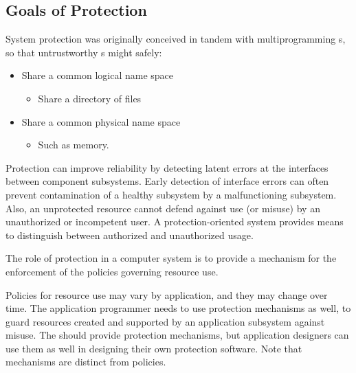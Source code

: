 \subsection{Goals of Protection}\label{subsec:Goals_of_Protection}
System protection was originally conceived in tandem with multiprogramming s, so that untrustworthy s might safely:
\begin{itemize}[noitemsep]
\item Share a common logical name space
  \begin{itemize}[noitemsep]
  \item Share a directory of files
  \end{itemize}
\item Share a common physical name space
  \begin{itemize}[noitemsep]
  \item Such as memory.
  \end{itemize}
\end{itemize}

Protection can improve reliability by detecting latent errors at the interfaces between component subsystems.
Early detection of interface errors can often prevent contamination of a healthy subsystem by a malfunctioning subsystem.
Also, an unprotected resource cannot defend against use (or misuse) by an unauthorized or incompetent user.
A protection-oriented system provides means to distinguish between authorized and unauthorized usage.

The role of protection in a computer system is to provide a mechanism for the enforcement of the policies governing resource use.

Policies for resource use may vary by application, and they may change over time.
The application programmer needs to use protection mechanisms as well, to guard resources created and supported by an application subsystem against misuse.
The  should provide protection mechanisms, but application designers can use them as well in designing their own protection software.
Note that mechanisms are distinct from policies.


